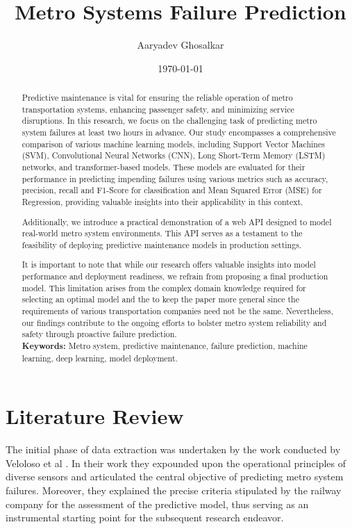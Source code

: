 \documentclass{article}
\title{Metro Systems Failure Prediction}
\author{Aaryadev Ghosalkar}
\date{\today}
\begin{document}
\maketitle

\begin{abstract}
Predictive maintenance is vital for ensuring the reliable operation of metro transportation systems, enhancing passenger safety, and minimizing service disruptions. In this research, we focus on the challenging task of predicting metro system failures at least two hours in advance. Our study encompasses a comprehensive comparison of various machine learning models, including Support Vector Machines (SVM), Convolutional Neural Networks (CNN), Long Short-Term Memory (LSTM) networks, and transformer-based models. These models are evaluated for their performance in predicting impending failures using various metrics such as accuracy, precision, recall and F1-Score for classification and Mean Squared Error (MSE) for Regression, providing valuable insights into their applicability in this context.

Additionally, we introduce a practical demonstration of a web API designed to model real-world metro system environments. This API serves as a testament to the feasibility of deploying predictive maintenance models in production settings.

It is important to note that while our research offers valuable insights into model performance and deployment readiness, we refrain from proposing a final production model. This limitation arises from the complex domain knowledge required for selecting an optimal model and the to keep the paper more general since the requirements of various transportation companies need not be the same. Nevertheless, our findings contribute to the ongoing efforts to bolster metro system reliability and safety through proactive failure prediction. \\

\textbf{Keywords:} Metro system, predictive maintenance, failure prediction, machine learning, deep learning, model deployment.
\end{abstract}

\newpage

\section*{Literature Review}

The initial phase of data extraction was
undertaken by the work conducted by Veloloso et al \cite{Veloso2022}. In their work they expounded upon the operational principles of diverse sensors
and articulated the central objective of predicting metro system failures. 
Moreover, they explained the precise criteria stipulated by the railway company for the assessment of the predictive model, thus serving as an instrumental starting point for the subsequent research endeavor. \\
\end{document}
